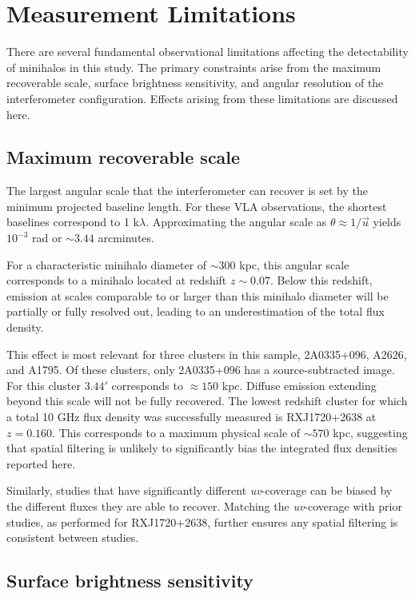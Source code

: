 \section{Measurement Limitations}
There are several fundamental observational limitations affecting the detectability of minihalos in this study. The primary constraints arise from the maximum recoverable scale, surface brightness sensitivity, and angular resolution of the interferometer configuration. Effects arising from these limitations are discussed here.

\subsection{Maximum recoverable scale}
The largest angular scale that the interferometer can recover is set by the minimum projected baseline length. For these VLA observations, the shortest baselines correspond to 1 k$\lambda$. Approximating the angular scale as $\theta \approx 1/\vec u$ yields $10^{-3}$ rad or $\sim\!3.44$ arcminutes. 

For a characteristic minihalo diameter of $\sim\!300$ kpc, this angular scale corresponds to a minihalo located at redshift $z \sim 0.07$. Below this redshift, emission at scales comparable to or larger than this minihalo diameter will be partially or fully resolved out, leading to an underestimation of the total flux density. 

This effect is most relevant for three clusters in this sample, 2A0335+096, A2626, and A1795. Of these clusters, only 2A0335+096 has a source-subtracted image. For this cluster $3.44'$ corresponds to $\approx150$ kpc. Diffuse emission extending beyond this scale will not be fully recovered. The lowest redshift cluster for which a total 10 GHz flux density was successfully measured is RXJ1720+2638 at $z=0.160$. This corresponds to a maximum physical scale of $\sim\!570$ kpc, suggesting that spatial filtering is unlikely to significantly bias the integrated flux densities reported here. 

Similarly, studies that have significantly different \textit{uv}-coverage can be biased by the different fluxes they are able to recover. Matching the \textit{uv}-coverage with prior studies, as performed for RXJ1720+2638, further ensures any spatial filtering is consistent between studies.

\subsection{Surface brightness sensitivity}

